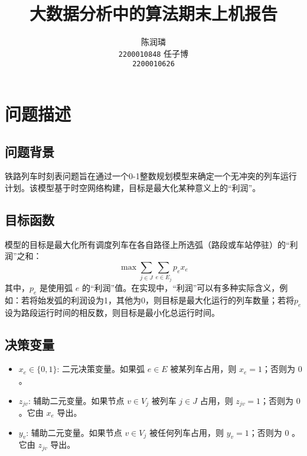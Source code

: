 \documentclass{article}
\title{大数据分析中的算法期末上机报告}
\author{%
    \large 陈润璘 \\
    \large \texttt{2200010848}
    \And
    \large 任子博 \\
    \large \texttt{2200010626}
}
\begin{document}
    \maketitle


    \section{问题描述}

    \subsection*{问题背景}
    铁路列车时刻表问题旨在通过一个0-1整数规划模型来确定一个无冲突的列车运行计划。该模型基于时空网络构建，目标是最大化某种意义上的“利润”。
    \subsection*{目标函数}
    模型的目标是最大化所有调度列车在各自路径上所选弧（路段或车站停驻）的“利润”之和：
    \begin{equation}
        \max \sum_{j \in J} \sum_{e \in E_j} p_e x_e\label{eq:obj}
    \end{equation}
    其中，$p_e$ 是使用弧 $e$ 的“利润”值。在实现中，“利润”可以有多种实际含义，例如：若将始发弧的利润设为1，其他为0，则目标是最大化运行的列车数量；若将$p_e$设为路段运行时间的相反数，则目标是最小化总运行时间。

    \subsection*{决策变量}
    \begin{itemize}
        \item $x_e \in \{0,1\}$: 二元决策变量。如果弧 $e \in E$ 被某列车占用，则 $x_e = 1$；否则为 $0$ 。
        \item $z_{jv}$: 辅助二元变量。如果节点 $v \in V_j$ 被列车 $j \in J$ 占用，则 $z_{jv} = 1$；否则为 $0$ 。它由 $x_e$ 导出。
        \item $y_v$: 辅助二元变量。如果节点 $v \in V_j$ 被任何列车占用，则 $y_v = 1$；否则为 $0$ 。它由 $z_{jv}$ 导出。
    \end{itemize}
\end{document}

